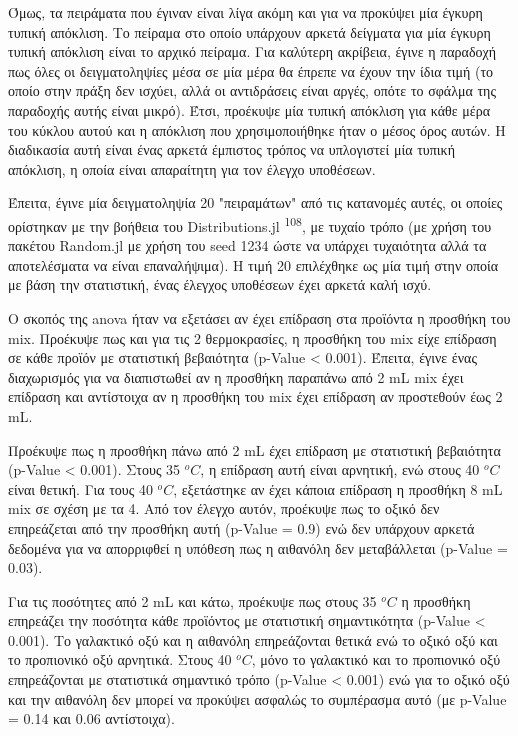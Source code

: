 \documentclass[11pt]{report}
\makeatletter
\newcommand{\citeprocitem}[2]{\hyper@linkstart{cite}{citeproc_bib_item_#1}#2\hyper@linkend}
\makeatother
\begin{document}
Όμως, τα πειράματα που έγιναν είναι λίγα ακόμη και για να προκύψει μία έγκυρη τυπική απόκλιση. Το πείραμα στο οποίο υπάρχουν αρκετά δείγματα για μία έγκυρη τυπική απόκλιση είναι το αρχικό πείραμα. Για καλύτερη ακρίβεια, έγινε η παραδοχή πως όλες οι δειγματοληψίες μέσα σε μία μέρα θα έπρεπε να έχουν την ίδια τιμή (το οποίο στην πράξη δεν ισχύει, αλλά οι αντιδράσεις είναι αργές, οπότε το σφάλμα της παραδοχής αυτής είναι μικρό). Έτσι, προέκυψε μία τυπική απόκλιση για κάθε μέρα του κύκλου αυτού και η απόκλιση που χρησιμοποιήθηκε ήταν ο μέσος όρος αυτών. Η διαδικασία αυτή είναι ένας αρκετά έμπιστος τρόπος να υπλογιστεί μία τυπική απόκλιση, η οποία είναι απαραίτητη για τον έλεγχο υποθέσεων.

Έπειτα, έγινε μία δειγματοληψία 20 "πειραμάτων" από τις κατανομές αυτές, οι οποίες ορίστηκαν με την βοήθεια του Distributions.jl \textsuperscript{\citeprocitem{108}{108}}, με τυχαίο τρόπο (με χρήση του πακέτου Random.jl με χρήση του seed 1234 ώστε να υπάρχει τυχαιότητα αλλά τα αποτελέσματα να είναι επαναλήψιμα). Η τιμή 20 επιλέχθηκε ως μία τιμή στην οποία με βάση την στατιστική, ένας έλεγχος υποθέσεων έχει αρκετά καλή ισχύ.

Ο σκοπός της \acrshort{anova} ήταν να εξετάσει αν έχει επίδραση στα προϊόντα η προσθήκη του \acrshort{mix}. Προέκυψε πως και για τις 2 θερμοκρασίες, η προσθήκη του \acrshort{mix} είχε επίδραση σε κάθε προϊόν με στατιστική βεβαιότητα (p-Value < 0.001). Έπειτα, έγινε ένας διαχωρισμός για να διαπιστωθεί αν η προσθήκη παραπάνω από 2 mL \acrshort{mix} έχει επίδραση και αντίστοιχα αν η προσθήκη του \acrshort{mix} έχει επίδραση αν προστεθούν έως 2 mL.

Προέκυψε πως η προσθήκη πάνω από 2 mL έχει επίδραση με στατιστική βεβαιότητα (p-Value < 0.001). Στους 35 \(^oC\), η επίδραση αυτή είναι αρνητική, ενώ στους 40 \(^oC\) είναι θετική. Για τους 40 \(^oC\), εξετάστηκε αν έχει κάποια επίδραση η προσθήκη 8 mL \acrshort{mix} σε σχέση με τα 4. Από τον έλεγχο αυτόν, προέκυψε πως το οξικό δεν επηρεάζεται από την προσθήκη αυτή (p-Value = 0.9) ενώ δεν υπάρχουν αρκετά δεδομένα για να απορριφθεί η υπόθεση πως η αιθανόλη δεν μεταβάλλεται (p-Value = 0.03). 

Για τις ποσότητες από 2 mL και κάτω, προέκυψε πως στους 35 \(^oC\) η προσθήκη επηρεάζει την ποσότητα κάθε προϊόντος με στατιστική σημαντικότητα (p-Value < 0.001). Το γαλακτικό οξύ και η αιθανόλη επηρεάζονται θετικά ενώ το οξικό οξύ και το προπιονικό οξύ αρνητικά. Στους 40 \(^oC\), μόνο το γαλακτικό και το προπιονικό οξύ επηρεάζονται με στατιστικά σημαντικό τρόπο (p-Value < 0.001) ενώ για το οξικό οξύ και την αιθανόλη δεν μπορεί να προκύψει ασφαλώς το συμπέρασμα αυτό (με p-Value = 0.14 και 0.06 αντίστοιχα).
\end{document}
